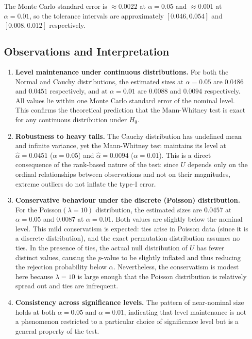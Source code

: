 \documentclass[10pt]{article}
\begin{document}
\noindent The Monte Carlo standard error is $\approx 0.0022$ at $\alpha = 0.05$ and $\approx 0.001$ at $\alpha = 0.01$, so the tolerance intervals are approximately $[0.046, 0.054]$ and $[0.008, 0.012]$ respectively.

\subsection{Observations and Interpretation}

\begin{enumerate}

    \item \textbf{Level maintenance under continuous distributions.}
    For both the Normal and Cauchy distributions, the estimated sizes at $\alpha = 0.05$ are $0.0486$ and $0.0451$ respectively, and at $\alpha = 0.01$ are $0.0088$ and $0.0094$ respectively. All values lie within one Monte Carlo standard error of the nominal level. This confirms the theoretical prediction that the Mann-Whitney test is exact for any continuous distribution under $H_0$.

    \item \textbf{Robustness to heavy tails.}
    The Cauchy distribution has undefined mean and infinite variance, yet the Mann-Whitney test maintains its level at $\widehat{\alpha} = 0.0451$ ($\alpha = 0.05$) and $\widehat{\alpha} = 0.0094$ ($\alpha = 0.01$). This is a direct consequence of the rank-based nature of the test: since $U$ depends only on the ordinal relationships between observations and not on their magnitudes, extreme outliers do not inflate the type-I error.

    \item \textbf{Conservative behaviour under the discrete (Poisson) distribution.}
    For the Poisson$(\lambda = 10)$ distribution, the estimated sizes are $0.0457$ at $\alpha = 0.05$ and $0.0087$ at $\alpha = 0.01$. Both values are slightly below the nominal level. This mild conservatism is expected: ties arise in Poisson data (since it is a discrete distribution), and the exact permutation distribution assumes no ties. In the presence of ties, the actual null distribution of $U$ has fewer distinct values, causing the $p$-value to be slightly inflated and thus reducing the rejection probability below $\alpha$. Nevertheless, the conservatism is modest here because $\lambda = 10$ is large enough that the Poisson distribution is relatively spread out and ties are infrequent.

    \item \textbf{Consistency across significance levels.}
    The pattern of near-nominal size holds at both $\alpha = 0.05$ and $\alpha = 0.01$, indicating that level maintenance is not a phenomenon restricted to a particular choice of significance level but is a general property of the test.


\end{enumerate}
\end{document}
